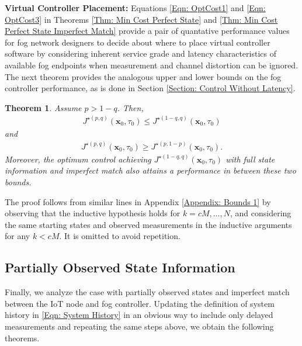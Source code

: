 \documentclass[10pt, journal, letterpaper]{IEEEtran}
\newcommand{\paren}[1]{\left(#1\right)}
\newcommand{\1}{\ensuremath{\mathbf{1}}} %
\newcommand{\mincost}[2]{\ensuremath{J^{\star\paren{#1, #2}}}\paren{\vec{x}_0, \tau_0}}
\renewcommand{\vec}[1]{\ensuremath{\boldsymbol{#1}}} %
\newtheorem{theorem}{Theorem}
\begin{document}
{\bf Virtual Controller Placement:} Equations \eqref{Eqn: OptCost1} and \eqref{Eqn: OptCost3} in Theorems \ref{Thm: Min Cost Perfect State} and \ref{Thm: Min Cost Perfect State Imperfect Match} provide a pair of quantative performance values for fog network designers to decide about where to place virtual controller software by considering inherent service grade and latency characteristics of available fog endpoints when measurement and channel distortion can be ignored. The next theorem provides the analogous upper and lower bounds on the fog controller performance, as is done in Section \ref{Section: Control Without Latency}.

\begin{theorem} \label{Thm: Min Cost Bounds3}
Assume $p > 1-q$. Then,
\begin{eqnarray*}
\mincost{p}{q} \leq \mincost{1-q}{q}
\end{eqnarray*}
and
\begin{eqnarray*}
\mincost{p}{q} \geq \mincost{p}{1-p}.
\end{eqnarray*}
Moreover, the optimum control achieving $\mincost{1-q}{q}$ with {\em full} state information and {\em imperfect} match also attains a performance in between these two bounds.
\end{theorem}
\begin{IEEEproof}
The proof follows from similar lines in Appendix \ref{Appendix: Bounds 1} by observing that the inductive hypothesis holds for $k= cM, \ldots, N$, and considering the same starting states and observed measurements in the inductive arguments for any $k < cM$. It is omitted to avoid repetition. \end{IEEEproof}

\subsection{Partially Observed State Information}
Finally, we analyze the case with partially observed states and imperfect match between the IoT node and fog controller. Updating the definition of system history in \eqref{Eqn: System History} in an obvious way to include only delayed measurements and repeating the same steps above, we obtain the following theorems.
\end{document}
